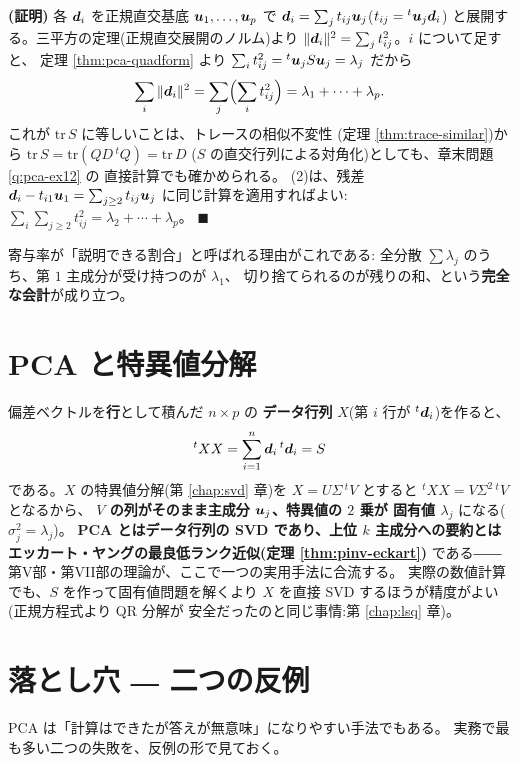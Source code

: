 \noindent\textbf{(証明)}\quad
各 $\bm{d}_i$ を正規直交基底 $\bm{u}_1, \dots, \bm{u}_p$ で
$\bm{d}_i = \sum_j t_{ij}\bm{u}_j$($t_{ij} = {}^t\bm{u}_j\bm{d}_i$)
と展開する。三平方の定理(正規直交展開のノルム)より
$\|\bm{d}_i\|^2 = \sum_j t_{ij}^2$。$i$ について足すと、
定理 \ref{thm:pca-quadform} より
$\sum_i t_{ij}^2 = {}^t\bm{u}_j S\bm{u}_j = \lambda_j$ だから
\[
\sum_i \|\bm{d}_i\|^2 = \sum_j \Bigl(\sum_i t_{ij}^2\Bigr)
= \lambda_1 + \cdots + \lambda_p.
\]
これが $\mathrm{tr}\,S$ に等しいことは、トレースの相似不変性
(定理 \ref{thm:trace-similar})から
$\mathrm{tr}\,S = \mathrm{tr}(Q D\,{}^tQ) = \mathrm{tr}\,D$
($S$ の直交行列による対角化)としても、章末問題 \ref{q:pca-ex12} の
直接計算でも確かめられる。
(2)は、残差 $\bm{d}_i - t_{i1}\bm{u}_1 = \sum_{j \ge 2}t_{ij}\bm{u}_j$
に同じ計算を適用すればよい:
$\sum_i \sum_{j\ge 2} t_{ij}^2 = \lambda_2 + \cdots + \lambda_p$。
$\blacksquare$

寄与率が「説明できる割合」と呼ばれる理由がこれである:
全分散 $\sum\lambda_j$ のうち、第 $1$ 主成分が受け持つのが $\lambda_1$、
切り捨てられるのが残りの和、という\textbf{完全な会計}が成り立つ。

\section{PCA と特異値分解}

偏差ベクトルを\textbf{行}として積んだ $n \times p$ の
\textbf{データ行列} $X$(第 $i$ 行が ${}^t\bm{d}_i$)を作ると、
\[
{}^tX X = \sum_{i=1}^{n} \bm{d}_i\,{}^t\bm{d}_i = S
\]
である。$X$ の特異値分解(第 \ref{chap:svd} 章)を
$X = U\Sigma\,{}^tV$ とすると
${}^tXX = V\Sigma^2\,{}^tV$ となるから、
\textbf{$V$ の列がそのまま主成分 $\bm{u}_j$、特異値の $2$ 乗が
固有値 $\lambda_j$} になる($\sigma_j^2 = \lambda_j$)。
\textbf{PCA とはデータ行列の SVD であり、上位 $k$ 主成分への要約とは
エッカート・ヤングの最良低ランク近似(定理 \ref{thm:pinv-eckart})}
である――第V部・第VII部の理論が、ここで一つの実用手法に合流する。
実際の数値計算でも、$S$ を作って固有値問題を解くより
$X$ を直接 SVD するほうが精度がよい(正規方程式より QR 分解が
安全だったのと同じ事情:第 \ref{chap:lsq} 章)。

\section{落とし穴 ― 二つの反例}

PCA は「計算はできたが答えが無意味」になりやすい手法でもある。
実務で最も多い二つの失敗を、反例の形で見ておく。

